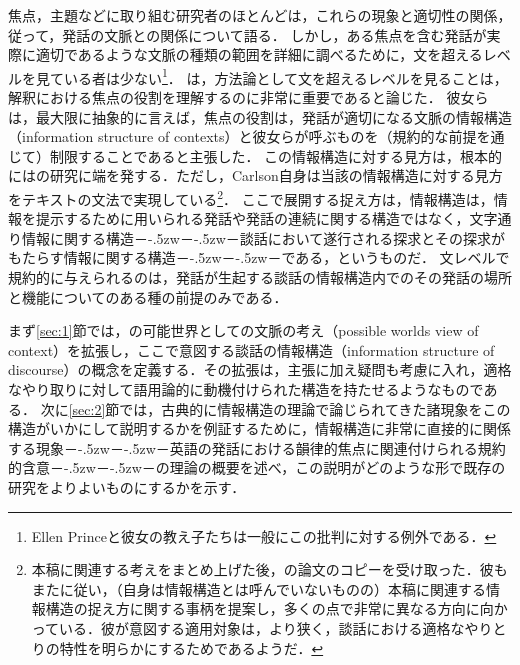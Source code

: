 \documentclass{goken}
\newcommand{\term}[2]{\textsf{#1}（#2）}
\def\ddash{－\kern-.5zw－\kern-.5zw－}
\newcommand{\ori}[1]{\noindent\textcolor[gray]{0.7}{\fontsize{8pt}{8pt}\selectfont{\textsf{(p.~#1)}}} }
\begin{document}
\renewcommand{\thefootnote}{\arabic{footnote}~}
\setcounter{footnote}{1}
焦点，主題などに取り組む研究者のほとんどは，これらの現象と適切性の関係，従って，発話の文脈との関係について語る．
しかし，ある焦点を含む発話が実際に適切であるような文脈の種類の範囲を詳細に調べるために，文を超えるレベルを見ている者は少ない\footnote{Ellen Princeと彼女の教え子たちは一般にこの批判に対する例外である．}．
\citet{KadmonRoberts1986}は，方法論として文を超えるレベルを見ることは，解釈における焦点の役割を理解するのに非常に重要であると論じた．
彼女らは，最大限に抽象的に言えば，焦点の役割は，発話が適切になる\term{文脈の情報構造}{information structure of contexts}と彼女らが呼ぶものを（規約的な前提を通じて）制限することであると主張した．
この情報構造に対する見方は，根本的には\citet{Carlson1982}の研究に端を発する．ただし，Carlson自身は当該の情報構造に対する見方をテキストの文法で実現している\footnote{本稿に関連する考えをまとめ上げた後，\citet{Ginzburg1996}の論文のコピーを受け取った．彼もまた\citeauthor{Carlson1982}に従い，（自身は情報構造とは呼んでいないものの）本稿に関連する情報構造の捉え方に関する事柄を提案し，多くの点で非常に異なる方向に向かっている．彼が意図する適用対象は，より狭く，談話における適格なやりとりの特性を明らかにするためであるようだ．}．
ここで展開する捉え方は，情報構造は，情報を提示するために用いられる発話や発話の連続に関する構造ではなく，文字通り情報に関する構造\ddash{}談話において遂行される探求とその探求がもたらす情報に関する構造\ddash{}である，というものだ．
文レベルで規約的に与えられるのは，発話が生起する談話の情報構造内でのその発話の場所と機能についてのある種の前提のみである．

\ori{3}
まず\ref{sec:1}節では，\citet{Stalnaker1978}の\term{可能世界としての文脈の考え}{possible worlds view of context}を拡張し，ここで意図する\term{談話の情報構造}{information structure of discourse}の概念を定義する．その拡張は，主張に加え疑問も考慮に入れ，適格なやり取りに対して語用論的に動機付けられた構造を持たせるようなものである．
次に\ref{sec:2}節では，古典的に情報構造の理論で論じられてきた諸現象をこの構造がいかにして説明するかを例証するために，情報構造に非常に直接的に関係する現象\ddash{}英語の発話における韻律的焦点に関連付けられる規約的含意\ddash{}の理論の概要を述べ，この説明がどのような形で既存の研究をよりよいものにするかを示す．
\end{document}
